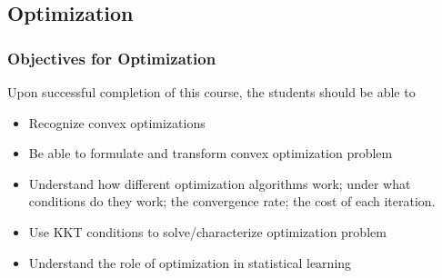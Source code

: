 \documentclass[10pt]{beamer}
\begin{document}
\subsection{Optimization}
\begin{frame}
  \frametitle{Objectives for Optimization}
  Upon successful completion of this course, the students should be able to
  \begin{itemize}
    \item <2-> Recognize convex optimizations
    \item <3-> Be able to formulate and transform convex optimization problem
    \item <4-> Understand how different optimization algorithms work; under what conditions do they work; the convergence rate; the cost of each iteration.
    \item <5-> Use KKT conditions to solve/characterize optimization problem
    \item <6-> Understand the role of optimization in statistical learning
  \end{itemize}
\end{frame}
\end{document}
